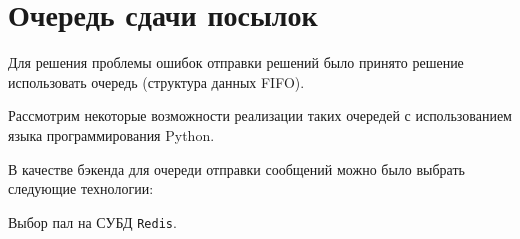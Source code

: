 \section{Очередь сдачи посылок}

Для решения проблемы ошибок отправки решений было принято решение использовать очередь (структура данных FIFO).

Рассмотрим некоторые возможности реализации таких очередей с использованием языка программирования Python.

В качестве бэкенда для очереди отправки сообщений можно было выбрать следующие технологии:

Выбор пал на СУБД \texttt{Redis}.

